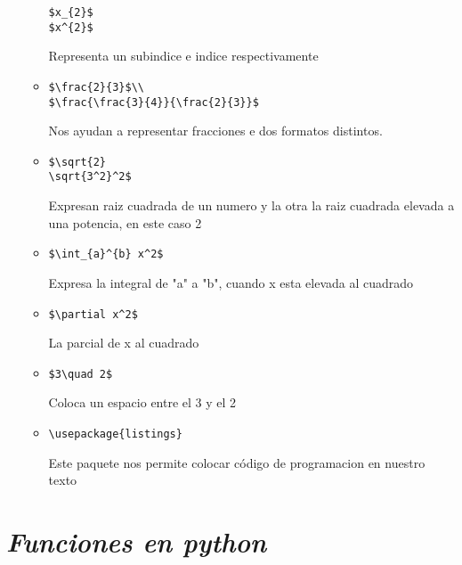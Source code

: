 \documentclass{book}
\begin{document}
\begin{enumerate}
\begin{itemize}
		\begin{lstlisting}  
$x_{2}$
$x^{2}$
		\end{lstlisting}  Representa un subindice e indice respectivamente
		\item 
		\begin{lstlisting}  
$\frac{2}{3}$\\
$\frac{\frac{3}{4}}{\frac{2}{3}}$
		\end{lstlisting} Nos ayudan a representar fracciones e dos formatos distintos.
		\item
		\begin{lstlisting}  
$\sqrt{2} 
\sqrt{3^2}^2$
		\end{lstlisting} Expresan raiz cuadrada de un numero y la otra la raiz cuadrada elevada a una potencia, en este caso 2
		\item
		\begin{lstlisting} 
$\int_{a}^{b} x^2$
		\end{lstlisting} Expresa la integral de "a" a "b", cuando x esta elevada al cuadrado
		\item
		\begin{lstlisting}  
$\partial x^2$
		\end{lstlisting} La parcial de x al cuadrado
		\item
		\begin{lstlisting} 
$3\quad 2$ 			
		\end{lstlisting} Coloca un espacio entre el 3 y el 2
		\item
		\begin{lstlisting} 
\usepackage{listings}			
		\end{lstlisting} Este paquete nos permite colocar código de programacion en nuestro texto
		
		
		
		
		
	\end{itemize}
	
	
	
	
\end{enumerate}%





\section{\textit{Funciones en python}}%
\begin{flushright}
	\date{16 de enero de 2019}
\end{flushright}
\end{document}
